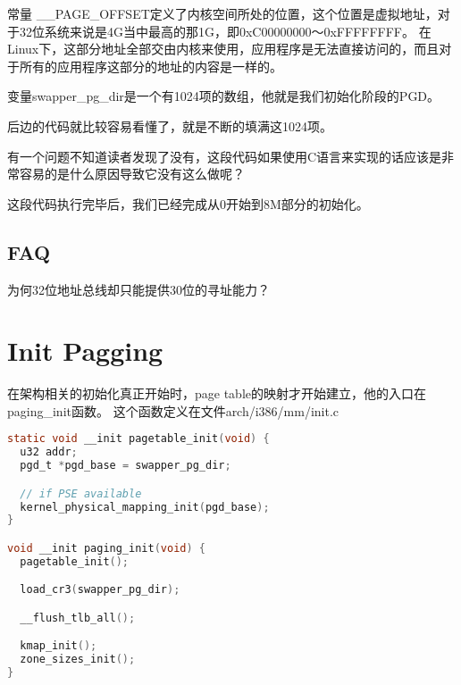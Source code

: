 常量 \_\_PAGE\_OFFSET定义了内核空间所处的位置，这个位置是虚拟地址，对于32位系统来说是4G当中最高的那1G，即0xC00000000～0xFFFFFFFF。
在Linux下，这部分地址全部交由内核来使用，应用程序是无法直接访问的，而且对于所有的应用程序这部分的地址的内容是一样的。

变量swapper\_pg\_dir是一个有1024项的数组，他就是我们初始化阶段的PGD。

后边的代码就比较容易看懂了，就是不断的填满这1024项。


有一个问题不知道读者发现了没有，这段代码如果使用C语言来实现的话应该是非常容易的是什么原因导致它没有这么做呢？

这段代码执行完毕后，我们已经完成从0开始到8M部分的初始化。

\subsection{FAQ}
为何32位地址总线却只能提供30位的寻址能力？

\section{Init Pagging}

在架构相关的初始化真正开始时，page table的映射才开始建立，他的入口在paging\_init函数。
这个函数定义在文件arch/i386/mm/init.c
\begin{lstlisting}[language=C]
static void __init pagetable_init(void) {
  u32 addr;
  pgd_t *pgd_base = swapper_pg_dir;

  // if PSE available
  kernel_physical_mapping_init(pgd_base);
}

void __init paging_init(void) {
  pagetable_init();

  load_cr3(swapper_pg_dir);

  __flush_tlb_all();

  kmap_init();
  zone_sizes_init();
}
\end{lstlisting}


